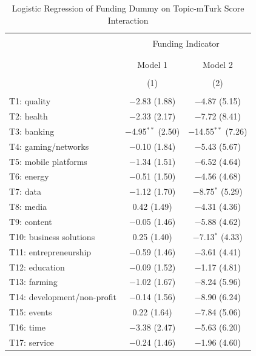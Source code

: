 \documentclass[12pt]{article}
\begin{document}
\begin{table}[!htbp] \centering 
  \caption{Logistic Regression of Funding Dummy on Topic-mTurk Score Interaction} 
  \label{} 
\footnotesize 
\begin{tabular}{@{\extracolsep{5pt}}lcc} 
\\[-1.8ex]\hline 
\hline \\[-1.8ex] 
 & \multicolumn{2}{c}{Funding Indicator} \\ 
\cline{2-3} 
\\[-1.8ex] & \multicolumn{2}{c}{} \\ 
 & Model 1 & Model 2 \\ 
\\[-1.8ex] & (1) & (2)\\ 
\hline \\[-1.8ex] 
 T1: quality & $-$2.83 (1.88) & $-$4.87 (5.15) \\ 
  T2: health & $-$2.33 (2.17) & $-$7.72 (8.41) \\ 
  T3: banking & $-$4.95$^{**}$ (2.50) & $-$14.55$^{**}$ (7.26) \\ 
  T4: gaming/networks & $-$0.10 (1.84) & $-$5.43 (5.67) \\ 
  T5: mobile platforms & $-$1.34 (1.51) & $-$6.52 (4.64) \\ 
  T6: energy & $-$0.51 (1.50) & $-$4.56 (4.68) \\ 
  T7: data & $-$1.12 (1.70) & $-$8.75$^{*}$ (5.29) \\ 
  T8: media & 0.42 (1.49) & $-$4.31 (4.36) \\ 
  T9: content & $-$0.05 (1.46) & $-$5.88 (4.62) \\ 
  T10: business solutions & 0.25 (1.40) & $-$7.13$^{*}$ (4.33) \\ 
  T11: entrepreneurship & $-$0.59 (1.46) & $-$3.61 (4.41) \\ 
  T12: education & $-$0.09 (1.52) & $-$1.17 (4.81) \\ 
  T13: farming & $-$1.02 (1.67) & $-$8.24 (5.96) \\ 
  T14: development/non-profit & $-$0.14 (1.56) & $-$8.90 (6.24) \\ 
  T15: events & 0.22 (1.64) & $-$7.84 (5.06) \\ 
  T16: time & $-$3.38 (2.47) & $-$5.63 (6.20) \\ 
  T17: service & $-$0.24 (1.46) & $-$1.96 (4.60) \\ 

\end{tabular}
\end{table}
\end{document}
